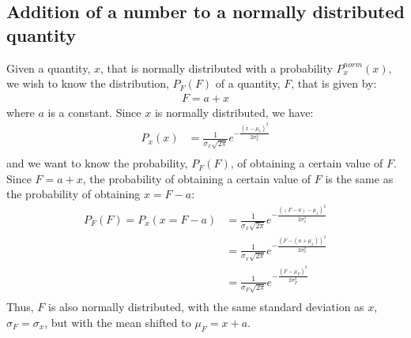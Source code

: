 \subsection{Addition of a number to a normally distributed quantity}
Given a quantity, $x$, that is normally distributed with a probability $P^{norm}_x(x)$, we wish to know the distribution, $P_F(F)$ of a quantity, $F$, that is given by:
\begin{align*}
F=a+x
\end{align*}
where $a$ is a constant. Since $x$ is normally distributed, we have:
\begin{align*}
P_x(x)&=\frac{1}{\sigma_x\sqrt{2\pi}}e^{-\frac{(x-\mu_x)^2}{2\sigma_x^2}}\\
\end{align*}
and we want to know the probability, $P_F(F)$, of obtaining a certain value of $F$. Since $F=a+x$, the probability of obtaining a certain value of $F$ is the same as the probability of obtaining $x=F-a$:
\begin{align*}
P_F(F)=P_x(x=F-a)&=\frac{1}{\sigma_x\sqrt{2\pi}}e^{-\frac{((F-a)-\mu_x)^2}{2\sigma_x^2}}\\
&=\frac{1}{\sigma_x\sqrt{2\pi}}e^{-\frac{(F-(a+\mu_x))^2}{2\sigma_x^2}}\\
&=\frac{1}{\sigma_F\sqrt{2\pi}}e^{-\frac{(F-\mu_F)^2}{2\sigma_F^2}}\\
\end{align*}
Thus, $F$ is also normally distributed, with the same standard deviation as $x$, $\sigma_F=\sigma_x$, but with the mean shifted to $\mu_F=x+a$.
